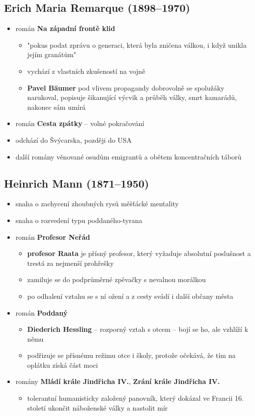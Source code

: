 \subsection{Erich Maria Remarque (1898--1970)}
\begin{itemize}
\item román \textbf{Na západní frontě klid}
	\begin{itemize}
	\item "pokus podat zprávu o generaci, která byla zničena válkou, i když unikla jejím granátům"
	\item vychází z vlastních zkušeností na vojně
	\item \textbf{Pavel Bäumer} pod vlivem propagandy dobrovolně se spolužáky narukoval, popisuje šikanující výcvik a průběh války, smrt kamarádů, nakonec sám umírá
	\end{itemize}
\item román \textbf{Cesta zpátky} -- volné pokračování
\item odchází do Švýcarska, později do USA
\item další romány věnované osudům emigrantů a obětem koncentračních táborů
\end{itemize}

\subsection{Heinrich Mann (1871--1950)}
\begin{itemize}
\item snaha o zachycení zhoubných rysů měšťácké mentality
\item snaha o rozvedení typu poddaného-tyrana
\item román \textbf{Profesor Neřád}
	\begin{itemize}
	\item \textbf{profesor Raata} je přísný profesor, který vyžaduje absolutní poslušnost a trestá za nejmenší prohřešky
	\item zamiluje se do podprůměrné zpěvačky s nevalnou morálkou
	\item po odhalení vztahu se s ní ožení a z cesty svádí i další občany města
	\end{itemize}
\item román \textbf{Poddaný}
	\begin{itemize}
	\item \textbf{Diederich Hessling} -- rozporný vztah s otcem -- bojí se ho, ale vzhlíží k němu
	\item podřizuje se přísnému režimu otce i školy, protože očekává, že tím na oplátku získá část moci
	\end{itemize}
\item romány \textbf{Mládí krále Jindřicha IV.}, \textbf{Zrání krále Jindřicha IV.}
	\begin{itemize}
	\item tolerantní humanisticky založený panovník, který dokázal ve Francii 16. století ukončit náboženské války a nastolit mír
	\end{itemize}
\end{itemize}

